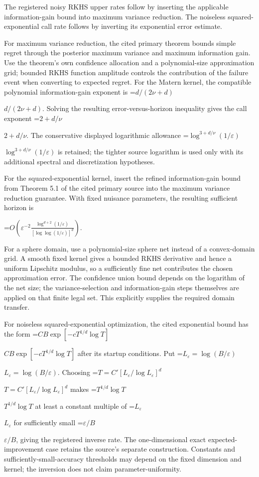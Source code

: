 \documentclass[10pt,a4paper]{article}
\newcommand{\AtlasMath}[1]{\par\begingroup\centering\setbox0=\hbox{$\displaystyle #1$}\ifdim\wd0>1.4\linewidth\typeout{ATLAS WIDE FORMULA: \the\wd0}\fi\ifdim\wd0>\linewidth\resizebox{\linewidth}{!}{\box0}\else\box0\fi\par\endgroup}
\newcommand{\AtlasInlineMath}[1]{\begingroup\setbox0=\hbox{$#1$}\ifdim\wd0>.4\linewidth\endgroup\AtlasMath{#1}\else\endgroup$#1$\fi}
\begin{document}
The registered noisy RKHS upper rates follow by inserting the applicable information-gain bound into maximum variance reduction. The noiseless squared-exponential call rate follows by inverting its exponential error estimate.

For maximum variance reduction, the cited primary theorem bounds simple regret through the posterior maximum variance and maximum information gain. Use the theorem's own confidence allocation and a polynomial-size approximation grid; bounded RKHS function amplitude controls the contribution of the failure event when converting to expected regret. For the Matern kernel, the compatible polynomial information-gain exponent is \AtlasInlineMath{d/(2\nu+d)}. Solving the resulting error-versus-horizon inequality gives the call exponent \AtlasInlineMath{2+d/\nu}. The conservative displayed logarithmic allowance \AtlasInlineMath{\log^{3+d/\nu}(1/\varepsilon)} is retained; the tighter source logarithm is used only with its additional spectral and discretization hypotheses.

For the squared-exponential kernel, insert the refined information-gain bound from Theorem 5.1 of the cited primary source into the maximum variance reduction guarantee. With fixed nuisance parameters, the resulting sufficient horizon is

\AtlasMath{O\!\left(\varepsilon^{-2}\frac{\log^{d+2}(1/\varepsilon)}{[\log\log(1/\varepsilon)]^d}\right).}

For a sphere domain, use a polynomial-size sphere net instead of a convex-domain grid. A smooth fixed kernel gives a bounded RKHS derivative and hence a uniform Lipschitz modulus, so a sufficiently fine net contributes the chosen approximation error. The confidence union bound depends on the logarithm of the net size; the variance-selection and information-gain steps themselves are applied on that finite legal set. This explicitly supplies the required domain transfer.

For noiseless squared-exponential optimization, the cited exponential bound has the form \AtlasInlineMath{C B\exp[-cT^{1/d}\log T]} after its startup conditions. Put \AtlasInlineMath{L_\varepsilon=\log(B/\varepsilon)}. Choosing \AtlasInlineMath{T=C'[L_\varepsilon/\log L_\varepsilon]^d} makes \AtlasInlineMath{T^{1/d}\log T} at least a constant multiple of \AtlasInlineMath{L_\varepsilon} for sufficiently small \AtlasInlineMath{\varepsilon/B}, giving the registered inverse rate. The one-dimensional exact expected-improvement case retains the source's separate construction. Constants and sufficiently-small-accuracy thresholds may depend on the fixed dimension and kernel; the inversion does not claim parameter-uniformity.
\end{document}
